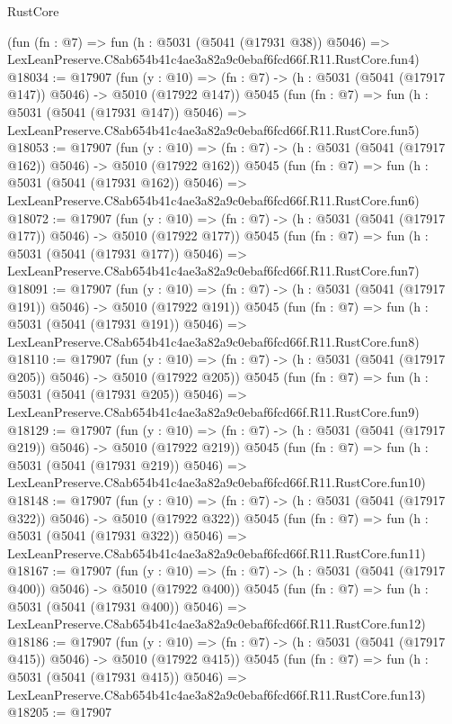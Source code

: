 \begin{lexlean}{RustCore}
\begin{coremodule}
    (fun (fn : @7) =>
    fun (h : @5031 (@5041 (@17931 @38)) @5046) =>
    LexLeanPreserve.C8ab654b41c4ae3a82a9c0ebaf6fcd66f.R11.RustCore.fun4)
@18034 := @17907
    (fun (y : @10) => (fn : @7) -> (h : @5031 (@5041 (@17917 @147)) @5046) -> @5010 (@17922 @147))
    @5045
    (fun (fn : @7) =>
    fun (h : @5031 (@5041 (@17931 @147)) @5046) =>
    LexLeanPreserve.C8ab654b41c4ae3a82a9c0ebaf6fcd66f.R11.RustCore.fun5)
@18053 := @17907
    (fun (y : @10) => (fn : @7) -> (h : @5031 (@5041 (@17917 @162)) @5046) -> @5010 (@17922 @162))
    @5045
    (fun (fn : @7) =>
    fun (h : @5031 (@5041 (@17931 @162)) @5046) =>
    LexLeanPreserve.C8ab654b41c4ae3a82a9c0ebaf6fcd66f.R11.RustCore.fun6)
@18072 := @17907
    (fun (y : @10) => (fn : @7) -> (h : @5031 (@5041 (@17917 @177)) @5046) -> @5010 (@17922 @177))
    @5045
    (fun (fn : @7) =>
    fun (h : @5031 (@5041 (@17931 @177)) @5046) =>
    LexLeanPreserve.C8ab654b41c4ae3a82a9c0ebaf6fcd66f.R11.RustCore.fun7)
@18091 := @17907
    (fun (y : @10) => (fn : @7) -> (h : @5031 (@5041 (@17917 @191)) @5046) -> @5010 (@17922 @191))
    @5045
    (fun (fn : @7) =>
    fun (h : @5031 (@5041 (@17931 @191)) @5046) =>
    LexLeanPreserve.C8ab654b41c4ae3a82a9c0ebaf6fcd66f.R11.RustCore.fun8)
@18110 := @17907
    (fun (y : @10) => (fn : @7) -> (h : @5031 (@5041 (@17917 @205)) @5046) -> @5010 (@17922 @205))
    @5045
    (fun (fn : @7) =>
    fun (h : @5031 (@5041 (@17931 @205)) @5046) =>
    LexLeanPreserve.C8ab654b41c4ae3a82a9c0ebaf6fcd66f.R11.RustCore.fun9)
@18129 := @17907
    (fun (y : @10) => (fn : @7) -> (h : @5031 (@5041 (@17917 @219)) @5046) -> @5010 (@17922 @219))
    @5045
    (fun (fn : @7) =>
    fun (h : @5031 (@5041 (@17931 @219)) @5046) =>
    LexLeanPreserve.C8ab654b41c4ae3a82a9c0ebaf6fcd66f.R11.RustCore.fun10)
@18148 := @17907
    (fun (y : @10) => (fn : @7) -> (h : @5031 (@5041 (@17917 @322)) @5046) -> @5010 (@17922 @322))
    @5045
    (fun (fn : @7) =>
    fun (h : @5031 (@5041 (@17931 @322)) @5046) =>
    LexLeanPreserve.C8ab654b41c4ae3a82a9c0ebaf6fcd66f.R11.RustCore.fun11)
@18167 := @17907
    (fun (y : @10) => (fn : @7) -> (h : @5031 (@5041 (@17917 @400)) @5046) -> @5010 (@17922 @400))
    @5045
    (fun (fn : @7) =>
    fun (h : @5031 (@5041 (@17931 @400)) @5046) =>
    LexLeanPreserve.C8ab654b41c4ae3a82a9c0ebaf6fcd66f.R11.RustCore.fun12)
@18186 := @17907
    (fun (y : @10) => (fn : @7) -> (h : @5031 (@5041 (@17917 @415)) @5046) -> @5010 (@17922 @415))
    @5045
    (fun (fn : @7) =>
    fun (h : @5031 (@5041 (@17931 @415)) @5046) =>
    LexLeanPreserve.C8ab654b41c4ae3a82a9c0ebaf6fcd66f.R11.RustCore.fun13)
@18205 := @17907

\end{coremodule}
\end{lexlean}
